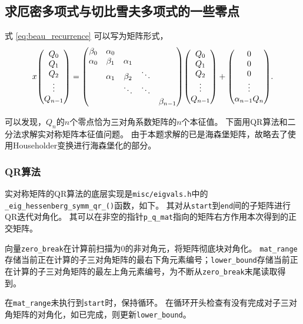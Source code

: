 \documentclass[a4paper,unicode]{report}
\begin{document}
\subsection{求厄密多项式与切比雪夫多项式的一些零点}
式 \eqref{eq:beau_recurrence} 可以写为矩阵形式，
\begin{equation}\label{eq:mat_eig}
    x \mqty(
        Q_0\\   Q_1\\   Q_2\\   \vdots\\    Q_{n-1}
    )
    = \mqty(
        \beta_0&    \alpha_0&&&\\
        \alpha_0& \beta_1&  \alpha_1&&\\
        &   \alpha_1&   \beta_2&    \ddots&\\
        && \ddots&\ddots&\\
        &&&&    \beta_{n-1}
    ) \mqty(
        Q_0\\   Q_1\\   Q_2\\   \vdots\\    Q_{n-1}
    )
    + \mqty(
        0\\   0\\   0\\   \vdots\\    \alpha_{n-1}Q_n
    ).
\end{equation}

可以发现，$Q_n$的$n$个零点恰为三对角系数矩阵的$n$个本征值。
下面用QR算法和二分法求解实对称矩阵本征值问题。
由于本题求解的已是海森堡矩阵，故略去了使用Householder变换进行海森堡化的部分。

\subsubsection{QR算法}
实对称矩阵的QR算法的底层实现是\texttt{misc/eigvals.h}中的\texttt{\_eig\_hessenberg\_symm\_qr\_()}函数，如下。
其对从\texttt{start}到\texttt{end}间的子矩阵进行QR迭代对角化。
其可以在非空的指针\texttt{p\_q\_mat}指向的矩阵右方作用本次得到的正交矩阵。
{
    \linespread{1.0}
    
}
向量\texttt{zero\_break}在计算前扫描为0的非对角元，将矩阵彻底块对角化。
\texttt{mat\_range}存储当前正在计算的子三对角矩阵的最右下角元素编号；\texttt{lower\_bound}存储当前正在计算的子三对角矩阵的最左上角元素编号，为不断从\texttt{zero\_break}末尾读取得到。

在\texttt{mat\_range}未执行到\texttt{start}时，保持循环。
在循环开头检查有没有完成对子三对角矩阵的对角化，如已完成，则更新\texttt{lower\_bound}。
\end{document}

